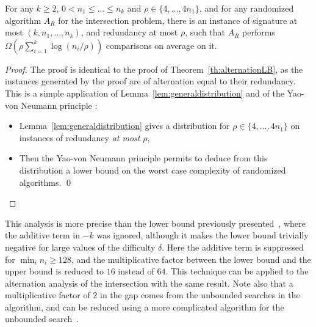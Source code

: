 \begin{theorem}\label{th:standalonelowerbound} \label{th:redundancyLB}
For any $k\geq 2$, $0{<}n_1{\leq}\ldots{\leq}n_k$ and
$\rho\in\{4,\ldots,4n_1\}$, 
%
and for any randomized algorithm $A_R$ for the intersection problem,
%
there is an instance of signature at most $(k,n_1,\ldots,n_k)$, and
redundancy at most $\rho$,
%
such that $A_R$ performs $\Omega(\rho\sum_{i=1}^k\log(n_i/\rho))$
comparisons on average on it.
\end{theorem}

\begin{proof}
The proof is identical to the proof of Theorem~\ref{th:alternationLB},
as the instances generated by the proof are of alternation equal to
their redundancy.
%
This is a simple application of Lemma~\ref{lem:generaldistribution} and
of the Yao-von Neumann principle \cite{vonneumann1944,sion58,yao}:
\begin{itemize}
\item Lemma~\ref{lem:generaldistribution} gives a distribution for
$\rho\in\{4,\ldots,4n_1\}$ on instances of redundancy {\em at most}
$\rho$, 
\item Then the Yao-von Neumann principle permits to deduce from this
distribution a lower bound on the worst case complexity of randomized
algorithms.  \qed\end{itemize}
\end{proof}


This analysis is more precise than the lower bound previously
presented~\cite{adaptiveIntersectionAndTThresholdProblems}, where the
additive term in $-k$ was ignored, although it makes the lower bound
trivially negative for large values of the difficulty $\delta$.
%
Here the additive term is suppressed for $\min_i n_i\geq128$, and the
multiplicative factor between the lower bound and the upper bound is
reduced to $16$ instead of $64$.
%
This technique can be applied to the alternation analysis of the
intersection with the same result.
%
Note also that a multiplicative factor of $2$ in the gap comes from
the unbounded searches in the algorithm, and can be reduced using a
more complicated algorithm for the unbounded
search~\cite{anAlmostOptimalAlgorithmForUnboundedSearching}.



